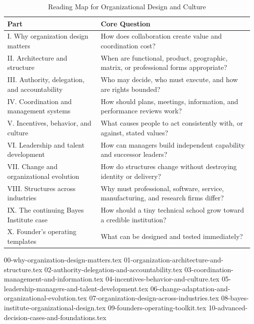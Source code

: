 \begin{table}[t]
\centering
\small
\caption{Reading Map for Organizational Design and Culture}
\label{tab:ch26_reading_map}
\begin{tabularx}{\textwidth}{p{4.4cm} X}
\toprule
\textbf{Part} & \textbf{Core Question} \\
\midrule
I. Why organization design matters & How does collaboration create value and coordination cost? \\
II. Architecture and structure & When are functional, product, geographic, matrix, or professional forms appropriate? \\
III. Authority, delegation, and accountability & Who may decide, who must execute, and how are rights bounded? \\
IV. Coordination and management systems & How should plans, meetings, information, and performance reviews work? \\
V. Incentives, behavior, and culture & What causes people to act consistently with, or against, stated values? \\
VI. Leadership and talent development & How can managers build independent capability and successor leaders? \\
VII. Change and organizational evolution & How do structures change without destroying identity or delivery? \\
VIII. Structures across industries & Why must professional, software, service, manufacturing, and research firms differ? \\
IX. The continuing Bayes Institute case & How should a tiny technical school grow toward a credible institution? \\
X. Founder's operating templates & What can be designed and tested immediately? \\
\bottomrule
\end{tabularx}
\end{table}

{00-why-organization-design-matters.tex}
{01-organization-architecture-and-structure.tex}
{02-authority-delegation-and-accountability.tex}
{03-coordination-management-and-information.tex}
{04-incentives-behavior-and-culture.tex}
{05-leadership-managers-and-talent-development.tex}
{06-change-adaptation-and-organizational-evolution.tex}
{07-organization-design-across-industries.tex}
{08-bayes-institute-organizational-design.tex}
{09-founders-operating-toolkit.tex}
{10-advanced-decision-cases-and-foundations.tex}
